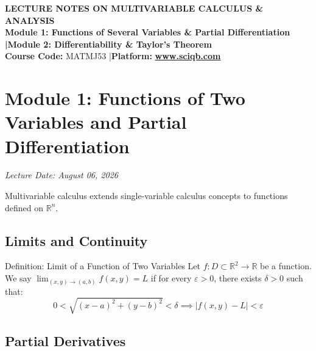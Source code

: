 \documentclass[11pt,a4paper]{article}
\begin{document}
\begin{center}
    \begin{tcolorbox}[sharp corners, boxrule=1.5pt]
        \begin{center}
            {\Large \bfseries \color{primarynavy} LECTURE NOTES ON MULTIVARIABLE CALCULUS \& ANALYSIS}\\[4pt]
            {\large \bfseries \color{secondaryteal} Module 1: Functions of Several Variables \& Partial Differentiation \quad|\quad Module 2: Differentiability \& Taylor's Theorem}\\[6pt]
            {\small \textbf{Course Code:} MATMJ53 \quad|\quad \textbf{Platform:} \href{https://www.sciqb.com}{\color{accentblue}\textbf{www.sciqb.com}}}
        \end{center}
    \end{tcolorbox}
\end{center}

\vspace{0.3cm}

\tableofcontents
\newpage

\section{Module 1: Functions of Two Variables and Partial Differentiation}
\textit{Lecture Date: August 06, 2026}

Multivariable calculus extends single-variable calculus concepts to functions defined on $\mathbb{R}^n$.

\subsection{Limits and Continuity}

\begin{defbox}{Definition: Limit of a Function of Two Variables}
Let $f: D \subset \mathbb{R}^2 \to \mathbb{R}$ be a function. We say $\lim_{(x,y) \to (a,b)} f(x,y) = L$ if for every $\varepsilon > 0$, there exists $\delta > 0$ such that:
\begin{equation}
    0 < \sqrt{(x-a)^2 + (y-b)^2} < \delta \implies |f(x,y) - L| < \varepsilon
\end{equation}
\end{defbox}

\subsection{Partial Derivatives}
\end{document}
